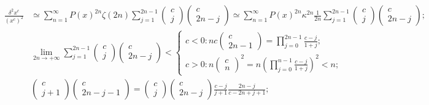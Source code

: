 \documentclass[twoside]{article}
\numberwithin{equation}{section}
\begin{document}
\begin{align*}
\frac{\delta^2 x^c}{(x^c)^2} &\simeq \sum_{n=1}^{\infty} P(x)^{2n} \zeta(2n) 
 		\sum_{j=1}^{2n-1} \begin{pmatrix} c \\ j \end{pmatrix} \begin{pmatrix} c \\ 2n - j \end{pmatrix}
 		\simeq \sum_{n=1}^{\infty} P(x)^{2n} \kappa^{2n} \frac{1}{2n}\sum_{j=1}^{2n-1} 
 				\begin{pmatrix} c \\ j \end{pmatrix} \begin{pmatrix} c \\ 2n - j \end{pmatrix}; \\
	&\lim_{2n \rightarrow +\infty}  \sum_{j=1}^{2n-1} \begin{pmatrix} c \\ j \end{pmatrix} \begin{pmatrix} c \\ 2n - j \end{pmatrix} 	< 
 		\begin{cases}		
 			c < 0:	n c  \begin{pmatrix} c \\ 2n - 1 \end{pmatrix} = \prod_{j=0}^{2n-1} \frac{c -j }{1 + j}; \\
 			c > 0:	n \begin{pmatrix} c \\ n \end{pmatrix}^2 = n \left( \prod_{j=0}^{n-1} \frac{c -j }{1 + j} \right)^2 < n;
 		\end{cases}\\
&\begin{pmatrix} c \\ j + 1 \end{pmatrix} \begin{pmatrix} c \\ 2n - j - 1 \end{pmatrix} 
		= \begin{pmatrix} c \\ j \end{pmatrix} \begin{pmatrix} c \\ 2n - j \end{pmatrix} \frac{c - j}{j + 1} \frac{2n - j}{c - 2n + j + 1}; \\

\end{align*}
\end{document}
